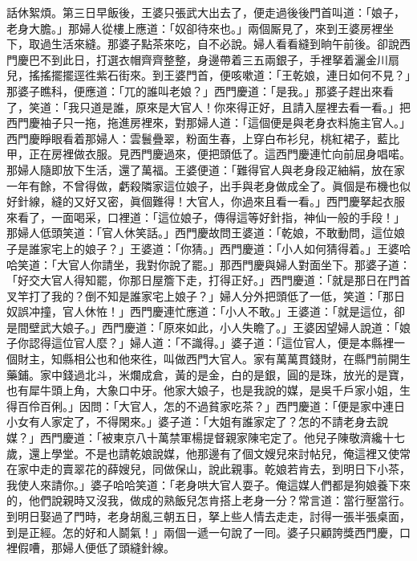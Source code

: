 話休絮煩。第三日早飯後，王婆只張武大出去了，便走過後後門首叫道：「娘子，老身大膽。」那婦人從樓上應道：「奴卻待來也。」兩個厮見了，來到王婆房裡坐下，取過生活來縫。那婆子點茶來吃，自不必說。婦人看看縫到晌午前後。卻說西門慶巴不到此日，{}打選衣帽齊齊整整，身邊帶着三五兩銀子，手裡拏着灑金川扇兒，搖搖擺擺逕徃紫石街來。到王婆門首，便咳嗽道：「王乾娘，連日如何不見？」那婆子瞧科，便應道：「兀的誰叫老娘？」西門慶道：「是我。」那婆子趕出來看了，笑道：「我只道是誰，原來是大官人！你來得正好，且請入屋裡去看一看。」把西門慶袖子只一拖，拖進房裡來，對那婦人道：「這個便是與老身衣料施主官人。」西門慶睜眼看着那婦人：雲鬟疊翠，粉面生春，上穿白布衫兒，桃紅裙子，藍比甲，正在房裡做衣服。見西門慶過來，便把頭低了。{}這西門慶連忙向前屈身唱喏。那婦人隨即放下生活，還了萬福。王婆便道：「難得官人與老身段疋紬絹，放在家一年有餘，不曾得做，虧殺隣家這位娘子，出手與老身做成全了。眞個是布機也似好針線，縫的又好又密，眞個難得！大官人，你過來且看一看。」西門慶拏起衣服來看了，一面喝采，口裡道：「這位娘子，傳得這等好針指，神仙一般的手段！」那婦人低頭笑道：「官人休笑話。」{}西門慶故問王婆道：「乾娘，不敢動問，這位娘子是誰家宅上的娘子？」王婆道：「你猜。」西門慶道：「小人如何猜得着。」王婆哈哈笑道：「大官人你請坐，我對你說了罷。」那西門慶與婦人對面坐下。那婆子道：「好交大官人得知罷，你那日屋簷下走，打得正好。」西門慶道：「就是那日在門首叉竿打了我的？倒不知是誰家宅上娘子？」婦人分外把頭低了一低，笑道：「那日奴誤冲撞，官人休恠！」{}西門慶連忙應道：「小人不敢。」王婆道：「就是這位，卻是間壁武大娘子。」西門慶道：「原來如此，小人失瞻了。」王婆因望婦人說道：「娘子你認得這位官人麼？」婦人道：「不識得。」婆子道：「這位官人，便是本縣裡一個財主，知縣相公也和他來徃，叫做西門大官人。家有萬萬貫錢財，在縣門前開生藥鋪。家中錢過北斗，米爛成倉，黃的是金，白的是銀，圓的是珠，放光的是寶，也有犀牛頭上角，大象口中牙。他家大娘子，也是我說的媒，是吳千戶家小姐，生得百伶百俐。」因問：「大官人，怎的不過貧家吃茶？」西門慶道：「便是家中連日小女有人家定了，不得閑來。」婆子道：「大姐有誰家定了？怎的不請老身去說媒？」西門慶道：「被東京八十萬禁軍楊提督親家陳宅定了。他兒子陳敬濟纔十七歲，還上學堂。不是也請乾娘說媒，他那邊有了個文嫂兒來討帖兒，俺這裡又使常在家中走的賣翠花的薛嫂兒，同做保山，說此親事。乾娘若肯去，到明日下小茶，我使人來請你。」婆子哈哈笑道：「老身哄大官人耍子。俺這媒人們都是狗娘養下來的，他們說親時又沒我，做成的熟飯兒怎肯搭上老身一分？常言道：當行壓當行。到明日娶過了門時，老身胡亂三朝五日，拏上些人情去走走，討得一張半張桌面，到是正經。怎的好和人鬬氣！」兩個一遞一句說了一囘。婆子只顧誇獎西門慶，口裡假嘈，那婦人便低了頭縫針線。


